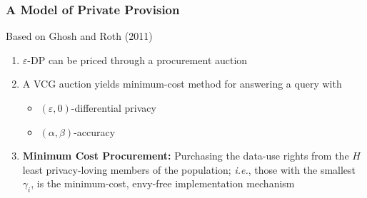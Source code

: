\begin{frame}[allowframebreaks]%
\frametitle{A Model of Private Provision}
Based on Ghosh and Roth (2011)
\begin{enumerate}
	\item $\varepsilon$-DP can be priced through a procurement auction
	\item A VCG auction yields minimum-cost method for answering a query with
	\begin{itemize}
		\item $\left( \varepsilon ,0\right) $-differential privacy
		\item $\left(\alpha ,\beta \right) $-accuracy
	\end{itemize}
	\item \textbf{Minimum Cost Procurement:} Purchasing the data-use rights from the $H$ least
privacy-loving members of the population; \textit{i.e.}, those with the
smallest $\gamma _{i}$, is the minimum-cost, envy-free implementation
mechanism
\end{enumerate}


\end{frame}%
%

